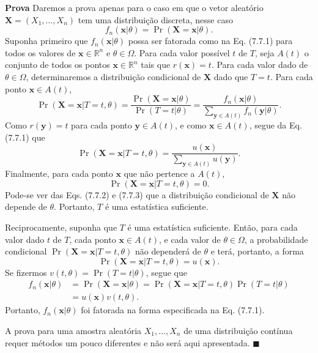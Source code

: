 \noindent\textbf{Prova} \quad Daremos a prova apenas para o caso em que o vetor aleatório $\mathbf{X}=(X_1, \dots, X_n)$ tem uma distribuição discreta, nesse caso
$$ f_n(\mathbf{x}|\theta) = \Pr(\mathbf{X}=\mathbf{x}|\theta). $$
Suponha primeiro que $f_n(\mathbf{x}|\theta)$ possa ser fatorada como na Eq. (7.7.1) para todos os valores de $\mathbf{x} \in \mathbb{R}^n$ e $\theta \in \Omega$. Para cada valor possível $t$ de $T$, seja $A(t)$ o conjunto de todos os pontos $\mathbf{x} \in \mathbb{R}^n$ tais que $r(\mathbf{x})=t$. Para cada valor dado de $\theta \in \Omega$, determinaremos a distribuição condicional de $\mathbf{X}$ dado que $T=t$. Para cada ponto $\mathbf{x} \in A(t)$,
$$ \Pr(\mathbf{X}=\mathbf{x}|T=t, \theta) = \frac{\Pr(\mathbf{X}=\mathbf{x}|\theta)}{\Pr(T=t|\theta)} = \frac{f_n(\mathbf{x}|\theta)}{\sum_{\mathbf{y} \in A(t)} f_n(\mathbf{y}|\theta)}. $$
Como $r(\mathbf{y})=t$ para cada ponto $\mathbf{y} \in A(t)$, e como $\mathbf{x} \in A(t)$, segue da Eq. (7.7.1) que
\begin{equation}
\Pr(\mathbf{X}=\mathbf{x}|T=t, \theta) = \frac{u(\mathbf{x})}{\sum_{\mathbf{y} \in A(t)} u(\mathbf{y})}. \tag{7.7.2}
\end{equation}
Finalmente, para cada ponto $\mathbf{x}$ que não pertence a $A(t)$,
\begin{equation}
\Pr(\mathbf{X}=\mathbf{x}|T=t, \theta) = 0. \tag{7.7.3}
\end{equation}
Pode-se ver das Eqs. (7.7.2) e (7.7.3) que a distribuição condicional de $\mathbf{X}$ não depende de $\theta$. Portanto, $T$ é uma estatística suficiente.

Reciprocamente, suponha que $T$ é uma estatística suficiente. Então, para cada valor dado $t$ de $T$, cada ponto $\mathbf{x} \in A(t)$, e cada valor de $\theta \in \Omega$, a probabilidade condicional $\Pr(\mathbf{X}=\mathbf{x}|T=t, \theta)$ não dependerá de $\theta$ e terá, portanto, a forma
$$ \Pr(\mathbf{X}=\mathbf{x}|T=t, \theta) = u(\mathbf{x}). $$
Se fizermos $v(t, \theta) = \Pr(T=t|\theta)$, segue que
\begin{align*}
f_n(\mathbf{x}|\theta) &= \Pr(\mathbf{X}=\mathbf{x}|\theta) = \Pr(\mathbf{X}=\mathbf{x}|T=t, \theta)\Pr(T=t|\theta) \\
&= u(\mathbf{x})v(t, \theta).
\end{align*}
Portanto, $f_n(\mathbf{x}|\theta)$ foi fatorada na forma especificada na Eq. (7.7.1).

A prova para uma amostra aleatória $X_1, \dots, X_n$ de uma distribuição contínua requer métodos um pouco diferentes e não será aqui apresentada. \hfill $\blacksquare$

